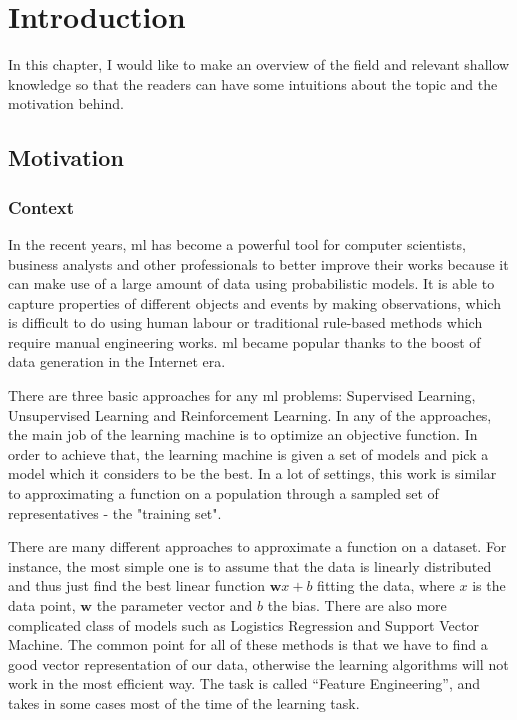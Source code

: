 \chapter{Introduction\label{cha:introduction}}
In this chapter, I would like to make an overview of the field and relevant shallow
knowledge so that the readers can have some intuitions about the topic and the motivation
behind. 

\section{Motivation\label{sec:moti}}
\subsection{Context}
In the recent years, \acrfull{ml} has become a powerful tool for computer scientists,
business analysts and other professionals to better improve their works because it can
make use of a large amount of data using probabilistic models. It is able to capture
properties of different objects and events by making observations, which is difficult to
do using human labour or traditional rule-based methods which require manual engineering
works. \acrshort{ml} became popular thanks to the boost of data generation in the
Internet era. 

There are three basic approaches for any \acrshort{ml} problems: Supervised Learning,
Unsupervised Learning and Reinforcement Learning. In any of the approaches, the main job
of the learning machine is to optimize an objective function. In order to achieve that,
the learning machine is given a set of models and pick a model which it considers to be
the best. In a lot of settings, this work is similar to approximating a function on a
population through a sampled set of representatives - the "training set".

There are many different approaches to approximate a function on a dataset. For instance,
the most simple one is to assume that the data is linearly distributed and thus just find
the best linear function $\mathbf{w}x + b$ fitting the data, where $x$ is the data point,
$\mathbf{w}$ the parameter vector and $b$ the bias. There are also more complicated class
of models such as Logistics Regression and Support Vector Machine. The common point for
all of these methods is that we have to find a good vector representation of our data,
otherwise the learning algorithms will not work in the most efficient way. The task is called
``Feature Engineering'', and takes in some cases most of the time of the learning task.

